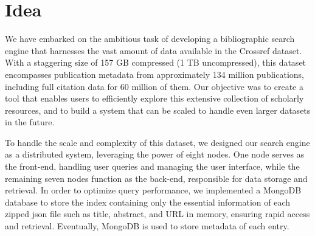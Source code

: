 \documentclass{article}
\begin{document}
\section{Idea}

We have embarked on the ambitious task of developing a bibliographic search engine that 
harnesses the vast amount of data available in the Crossref dataset. With a staggering size of 
157 GB compressed (1 TB uncompressed), this dataset encompasses publication metadata from 
approximately 134 million publications, including full citation data for 60 million of them. Our 
objective was to create a tool that enables users to efficiently explore this extensive 
collection of scholarly resources, and to build a system that can be scaled to handle even larger
datasets in the future.

To handle the scale and complexity of this dataset, we designed our search engine as a 
distributed system, leveraging the power of eight nodes. One node serves as the front-end, 
handling user queries and managing the user interface, while the remaining seven nodes function 
as the back-end, responsible for data storage and retrieval. In order to optimize query 
performance, we implemented a MongoDB database to store the index containing only the 
essential information of each zipped json file such as title, 
abstract, and URL in memory, ensuring rapid access and retrieval. Eventually, 
MongoDB is used to store metadata of each entry. 
\end{document}
